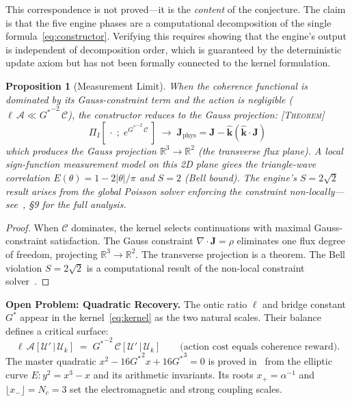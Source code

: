 \documentclass[11pt,a4paper]{article}
\newcommand{\Gstar}{{G^{*}}}
\newcommand{\Nc}{N_c}
\newcommand{\RR}{\mathbb{R}}
\newcommand{\UU}{\mathcal{U}}
\newcommand{\PP}{\Pi}
\newcommand{\onticell}{\ell}
\newcommand{\etag}[1]{{\normalfont\textsc{\footnotesize [#1]}}}
\theoremstyle{compact}
\newtheorem{proposition}{Proposition}
\begin{document}
This correspondence is not proved---it is the \emph{content} of the conjecture. The claim is that the five engine phases are a computational decomposition of the single formula~\eqref{eq:constructor}. Verifying this requires showing that the engine's output is independent of decomposition order, which is guaranteed by the deterministic update axiom but has not been formally connected to the kernel formulation.

\begin{proposition}[Measurement Limit]
\label{prop:measurement}
When the coherence functional is dominated by its Gauss-constraint term and the action is negligible ($\onticell\,\mathcal{A} \ll {G^*}^{-2}\,\mathcal{C}$), the constructor reduces to the Gauss projection: \etag{Theorem}
\[
\PP_I\!\left[\,\cdot\;;\; e^{{G^*}^{-2}\,\mathcal{C}}\,\right] \;\longrightarrow\; \mathbf{J}_{\mathrm{phys}} = \mathbf{J} - \hat{\mathbf{k}}(\hat{\mathbf{k}} \cdot \mathbf{J})
\]
which produces the Gauss projection $\RR^3 \to \RR^2$ (the transverse flux plane). A local sign-function measurement model on this 2D plane gives the triangle-wave correlation $E(\theta) = 1 - 2|\theta|/\pi$ and $S = 2$ (Bell bound). The engine's $S = 2\sqrt{2}$ result arises from the \emph{global} Poisson solver enforcing the constraint non-locally---see~\cite{lifecycle}, \S9 for the full analysis.
\end{proposition}

\begin{proof}
When $\mathcal{C}$ dominates, the kernel selects continuations with maximal Gauss-constraint satisfaction. The Gauss constraint $\nabla \cdot \mathbf{J} = \rho$ eliminates one flux degree of freedom, projecting $\RR^3 \to \RR^2$. The transverse projection is a theorem. The Bell violation $S = 2\sqrt{2}$ is a computational result of the non-local constraint solver~\cite{lifecycle}.
\end{proof}

\medskip
\noindent\textbf{Open Problem: Quadratic Recovery.}
\label{prop:quadratic}
The ontic ratio $\onticell$ and bridge constant $\Gstar$ appear in the kernel~\eqref{eq:kernel} as the two natural scales. Their balance defines a critical surface:
\[
\onticell\,\mathcal{A}[\UU'\,|\,\UU_k] \;=\; {G^*}^{-2}\,\mathcal{C}[\UU'\,|\,\UU_k] \qquad \text{(action cost equals coherence reward)}.
\]
The master quadratic $x^2 - 16{G^*}^2 x + 16{G^*}^3 = 0$ is proved in~\cite{lifecycle} from the elliptic curve $E: y^2 = x^3 - x$ and its arithmetic invariants. Its roots $x_+ = \alpha^{-1}$ and $\lfloor x_- \rfloor = \Nc = 3$ set the electromagnetic and strong coupling scales.
\end{document}
